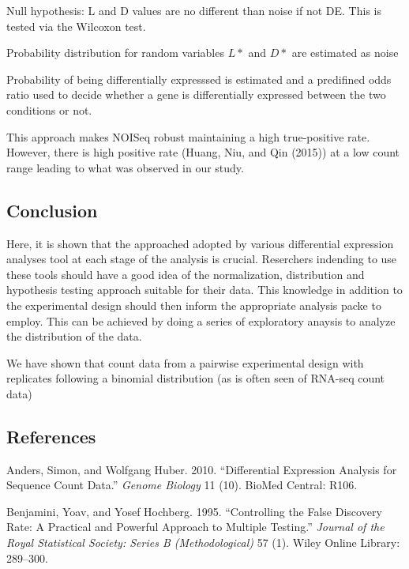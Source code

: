 \documentclass[]{article}
\begin{document}
Null hypothesis: L and D values are no different than noise if not DE.
This is tested via the Wilcoxon test.

Probability distribution for random variables \(L*\) and \(D*\) are
estimated as noise

Probability of being differentially expresssed is estimated and a
predifined odds ratio used to decide whether a gene is differentially
expressed between the two conditions or not.

This approach makes NOISeq robust maintaining a high true-positive rate.
However, there is high positive rate (Huang, Niu, and Qin (2015)) at a
low count range leading to what was observed in our study.

\hypertarget{conclusion}{%
\subsection{Conclusion}\label{conclusion}}

Here, it is shown that the approached adopted by various differential
expression analyses tool at each stage of the analysis is crucial.
Reserchers indending to use these tools should have a good idea of the
normalization, distribution and hypothesis testing approach suitable for
their data. This knowledge in addition to the experimental design should
then inform the appropriate analysis packe to employ. This can be
achieved by doing a series of exploratory anaysis to analyze the
distribution of the data.

We have shown that count data from a pairwise experimental design with
replicates following a binomial distribution (as is often seen of
RNA-seq count data)

\hypertarget{references}{%
\subsection*{References}\label{references}}

\hypertarget{refs}{}
\leavevmode\hypertarget{ref-anders2010differential}{}%
Anders, Simon, and Wolfgang Huber. 2010. ``Differential Expression
Analysis for Sequence Count Data.'' \emph{Genome Biology} 11 (10).
BioMed Central: R106.

\leavevmode\hypertarget{ref-benjamini1995controlling}{}%
Benjamini, Yoav, and Yosef Hochberg. 1995. ``Controlling the False
Discovery Rate: A Practical and Powerful Approach to Multiple Testing.''
\emph{Journal of the Royal Statistical Society: Series B
(Methodological)} 57 (1). Wiley Online Library: 289--300.
\end{document}
